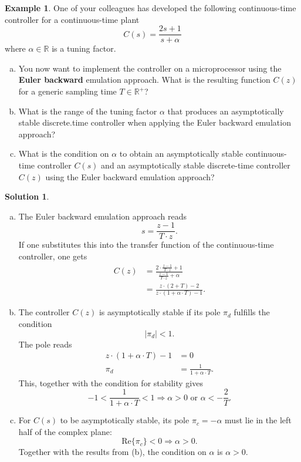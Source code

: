 \documentclass[a4paper,12 pt]{article}
\numberwithin{equation}{section}
\theoremstyle{definition}
\newtheorem{bsp}{Example}
\theoremstyle{remark}
\theoremstyle{definition}
\newtheorem*{lsg}{Solution}
\theoremstyle{definition}
\theoremstyle{definition}
\theoremstyle{remark}
\begin{document}
\begin{bsp}
One of your colleagues has developed the following continuous-time controller for a continuous-time plant
\begin{equation*}
C(s)=\frac{2s+1}{s+\alpha}
\end{equation*}
where $\alpha \in \mathbb{R}$ is a tuning factor.
\begin{enumerate}[(a)]
\item You now want to implement the controller on a microprocessor using the \textbf{Euler backward} emulation approach. What is the resulting function $C(z)$ for a generic sampling time $T \in \mathbb{R^+}$?
\item What is the range of the tuning factor $\alpha$ that produces an asymptotically stable discrete.time controller when applying the Euler backward emulation approach?
\item What is the condition on $\alpha$ to obtain an asymptotically stable continuous-time controller $C(s)$ and an asymptotically stable discrete-time controller $C(z)$ using the Euler backward emulation approach?
\end{enumerate}

\newpage
\begin{lsg}
\
\begin{enumerate}[(a)]
\item The Euler backward emulation approach reads
\begin{equation*}
s=\frac{z-1}{T\cdot z}.
\end{equation*}
If one substitutes this into the transfer function of the continuous-time controller, one gets
\begin{equation*}
\begin{split}
C(z)&=\frac{2\cdot \frac{z-1}{T\cdot z}+1}{\frac{z-1}{T\cdot z}+\alpha}\\
&=\frac{z\cdot (2+T)-2}{z\cdot(1+\alpha \cdot T)-1}.
\end{split}
\end{equation*}
\item The controller $C(z)$ is asymptotically stable if its pole $\pi_d$ fulfills the condition
$$|\pi_d|<1.$$
The pole reads
\begin{equation*}
\begin{split}
z\cdot(1+\alpha \cdot T)-1&=0\\
\pi_d &= \frac{1}{1+\alpha \cdot T}.
\end{split}
\end{equation*}
This, together with the condition for stability gives
\begin{equation*}
-1<\frac{1}{1+\alpha \cdot T}<1 \Rightarrow \alpha >0 \text{ or } \alpha<-\frac{2}{T}.
\end{equation*}
\item For $C(s)$ to be asymptotically stable, its pole $\pi_c=-\alpha$ must lie in the left half of the complex plane:
\begin{equation*}
\text{Re}\{ \pi_c \}<0 \Rightarrow \alpha>0.
\end{equation*}
Together with the results from (b), the condition on $\alpha$ is $\alpha>0$.





\end{enumerate}
\end{lsg}
\end{bsp}
\end{document}
